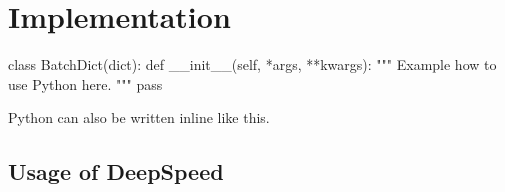 \section{Implementation}
\label{section:implementation}

\begin{python}
class BatchDict(dict):
    def __init__(self, *args, **kwargs):
        """
        Example how to use Python here.
        """
        pass
\end{python}

Python can also be written inline  like this.

\subsection{Usage of DeepSpeed}